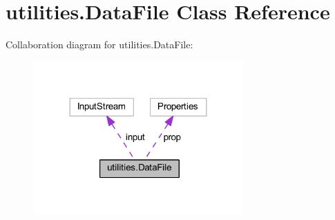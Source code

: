 \hypertarget{classutilities_1_1_data_file}{}\section{utilities.\+Data\+File Class Reference}
\label{classutilities_1_1_data_file}


Collaboration diagram for utilities.\+Data\+File\+:\nopagebreak
\begin{figure}[H]
\begin{center}
\leavevmode
\includegraphics[width=228pt]{classutilities_1_1_data_file__coll__graph}
\end{center}
\end{figure}

